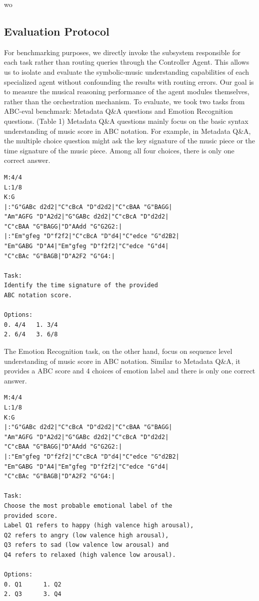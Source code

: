 wo\documentclass[sigconf]{acmart}
\begin{document}
\subsection {Evaluation Protocol}
For benchmarking purposes, we directly invoke the subsystem responsible for each task rather than routing queries through the Controller Agent. This allows us to isolate and evaluate the symbolic-music understanding capabilities of each specialized agent without confounding the results with routing errors. Our goal is to measure the musical reasoning performance of the agent modules themselves, rather than the orchestration mechanism. To evaluate, we took two tasks from ABC-eval benchmark: Metadata Q\&A questions and Emotion Recognition questions. (Table 1) Metadata Q\&A questions mainly focus on the basic syntax understanding of music score in ABC notation. For example, in Metadata Q\&A, the multiple choice question might ask the key signature of the music piece or the time signature of the music piece. Among all four choices, there is only one correct answer. 
\begin{tcolorbox}[title=Metadata Q\&A, colback=gray!10, colframe=gray!60, listing only]
\begin{verbatim}
M:4/4
L:1/8
K:G
|:"G"GABc d2d2|"C"cBcA "D"d2d2|"C"cBAA "G"BAGG|
"Am"AGFG "D"A2d2|"G"GABc d2d2|"C"cBcA "D"d2d2|
"C"cBAA "G"BAGG|"D"AAdd "G"G2G2:|
|:"Em"gfeg "D"f2f2|"C"cBcA "D"d4|"C"edce "G"d2B2|
"Em"GABG "D"A4|"Em"gfeg "D"f2f2|"C"edce "G"d4|
"C"cBAc "G"BAGB|"D"A2F2 "G"G4:|

Task:
Identify the time signature of the provided 
ABC notation score.

Options:
0. 4/4   1. 3/4
2. 6/4   3. 6/8
\end{verbatim}
\end{tcolorbox}
The Emotion Recognition task, on the other hand, focus on sequence level understanding of music score in ABC notation. Similar to Metadata Q\&A, it provides a ABC score and 4 choices of emotion label and there is only one correct answer.
\begin{tcolorbox}[title=Emotion Recognition, colback=gray!10, colframe=gray!60, listing only]
\begin{verbatim}
M:4/4
L:1/8
K:G
|:"G"GABc d2d2|"C"cBcA "D"d2d2|"C"cBAA "G"BAGG|
"Am"AGFG "D"A2d2|"G"GABc d2d2|"C"cBcA "D"d2d2|
"C"cBAA "G"BAGG|"D"AAdd "G"G2G2:|
|:"Em"gfeg "D"f2f2|"C"cBcA "D"d4|"C"edce "G"d2B2|
"Em"GABG "D"A4|"Em"gfeg "D"f2f2|"C"edce "G"d4|
"C"cBAc "G"BAGB|"D"A2F2 "G"G4:|

Task:
Choose the most probable emotional label of the 
provided score. 
Label Q1 refers to happy (high valence high arousal), 
Q2 refers to angry (low valence high arousal), 
Q3 refers to sad (low valence low arousal) and 
Q4 refers to relaxed (high valence low arousal).

Options:
0. Q1      1. Q2
2. Q3      3. Q4
\end{verbatim}
\end{tcolorbox}
\end{document}
